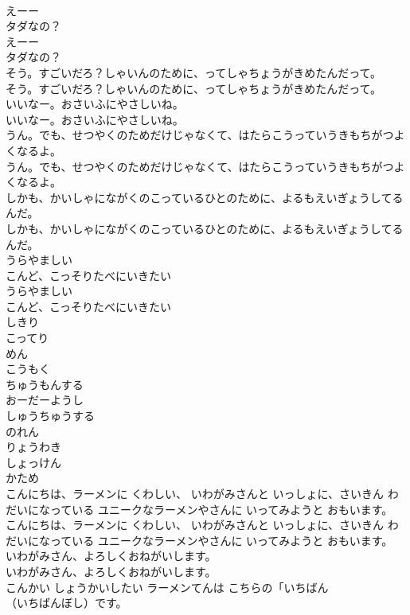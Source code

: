 \documentclass[8pt]{extreport}
\begin{document}
\begin{CJK}{UTF8}{min}
\\	えーー
\\	タダなの？
\\	えーー
\\	タダなの？
\\	そう。すごいだろ？しゃいんのために、ってしゃちょうがきめたんだって。
\\	そう。すごいだろ？しゃいんのために、ってしゃちょうがきめたんだって。
\\	いいなー。おさいふにやさしいね。
\\	いいなー。おさいふにやさしいね。
\\	うん。でも、せつやくのためだけじゃなくて、はたらこうっていうきもちがつよくなるよ。
\\	うん。でも、せつやくのためだけじゃなくて、はたらこうっていうきもちがつよくなるよ。
\\	しかも、かいしゃにながくのこっているひとのために、よるもえいぎょうしてるんだ。
\\	しかも、かいしゃにながくのこっているひとのために、よるもえいぎょうしてるんだ。
\\	うらやましい
\\	こんど、こっそりたべにいきたい
\\	うらやましい
\\	こんど、こっそりたべにいきたい
\\	しきり
\\	こってり
\\	めん
\\	こうもく
\\	ちゅうもんする
\\	おーだーようし
\\	しゅうちゅうする
\\	のれん
\\	りょうわき
\\	しょっけん
\\	かため
\\	こんにちは、ラーメンに くわしい、 いわがみさんと いっしょに、さいきん わだいになっている ユニークなラーメンやさんに いってみようと おもいます。
\\	こんにちは、ラーメンに くわしい、 いわがみさんと いっしょに、さいきん わだいになっている ユニークなラーメンやさんに いってみようと おもいます。
\\	いわがみさん、よろしくおねがいします。
\\	いわがみさん、よろしくおねがいします。
\\	こんかい しょうかいしたい ラーメンてんは こちらの「いちばん
\\	（いちばんぼし）です。

\end{CJK}
\end{document}
